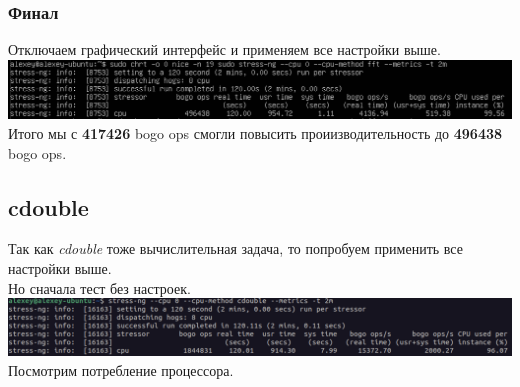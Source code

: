 \subsubsection{Финал}
Отключаем графический интерфейс и применяем все настройки выше. \\
\includegraphics[width=\textwidth]{image/cpu-max.png}
Итого мы с \textbf{417426} bogo ops смогли повысить проиизводительность до \textbf{496438} bogo ops.
\subsection{cdouble}
Так как \textit{cdouble} тоже вычислительная задача, то попробуем применить все настройки выше.\\
Но сначала тест без настроек. \\
\includegraphics[width=\textwidth]{image/cdouble-1.png}
Посмотрим потребление процессора.\\

